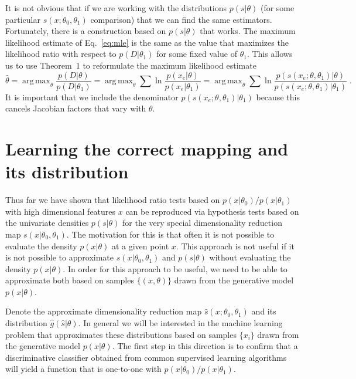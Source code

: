 \documentclass[11pt, oneside]{article}   	%
\DeclareMathOperator*{\argmax}{arg\,max}
\begin{document}
It is not obvious that if we are working with the distributions $p(s|\theta)$ (for some particular $s(x; \theta_0, \theta_1)$ comparison) that we can find the same estimators. 
Fortunately, there is a construction based on $p(s|\theta)$ that works. The maximum likelihood estimate of Eq.~\ref{eq:mle} is the same as the value that maximizes the likelihood ratio with respect to $p(D|\theta_1)$ for some fixed value of $\theta_1$. This allows us to use Theorem~1 to reformulate the maximum likelihood estimate
\begin{equation}
\hat{\theta} = \argmax_\theta \frac{ p(D | \theta)}{ p(D | \theta_1)} = \argmax_\theta  \sum \ln \frac{p(x_e | \theta)}{p(x_e|\theta_1)} = \argmax_\theta  \sum \ln \frac{p(s(x_e; \theta, \theta_1) | \theta)}{p(s(x_e; \theta, \theta_1) |\theta_1)} \; .
\end{equation}
It is important that we include the denominator $p(s(x_e; \theta, \theta_1) |\theta_1)$ because this cancels Jacobian factors that vary with $\theta$.

\section{Learning the correct mapping and its distribution}\label{S:classifier}

Thus far we have shown that likelihood ratio tests based on $p(x|\theta_0)/p(x|\theta_1)$ with high dimensional features $x$ can be reproduced via hypothesis tests based on the univariate densities $p(s|\theta)$ for the very special dimensionality reduction map $s(x|\theta_0, \theta_1)$. The motivation for this is that often it is not possible to evaluate the density $p(x|\theta)$ at a given point $x$.  This approach is not useful if it is not possible to approximate $s(x|\theta_0, \theta_1)$ and $p(s|\theta)$ without evaluating the density $p(x|\theta)$. In order for this approach to be useful, we need to be able to approximate both based on samples $\{(x,\theta)\}$ drawn from the generative model $p(x|\theta)$.  

Denote the approximate dimensionality reduction map $\hat{s}(x; \theta_0, \theta_1)$ and its distribution $\hat{g}(\hat{s}|\theta)$. In general we will be interested in the machine learning problem that approximates these distributions based on samples $\{x_i\}$ drawn from the generative model $p(x|\theta)$.  
The first step in this direction is to confirm that a discriminative classifier obtained from common supervised learning algorithms will yield a function that is one-to-one with $p(x|\theta_0)/p(x|\theta_1)$.
\end{document}
